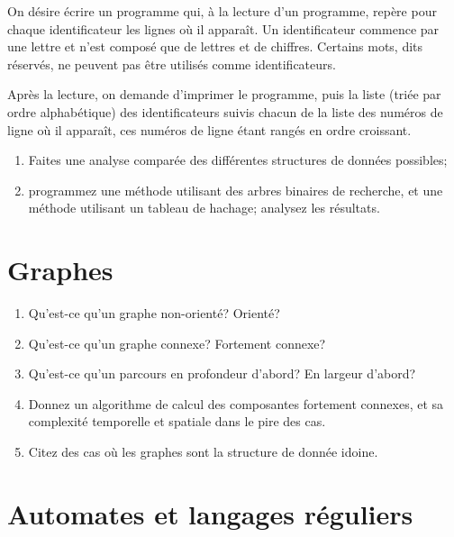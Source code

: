 \documentclass[11pt, a4paper]{article}
\begin{document}
On désire écrire un programme qui, à la lecture d'un programme, repère
pour chaque identificateur les lignes où il apparaît. Un
identificateur commence par une lettre et n'est composé que de lettres
et de chiffres. Certains mots, dits réservés, ne peuvent pas être
utilisés comme identificateurs.

Après la lecture, on demande d'imprimer le programme, puis la liste
(triée par ordre alphabétique) des identificateurs suivis chacun de la
liste des numéros de ligne où il apparaît, ces numéros de ligne étant
rangés en ordre croissant.

  \begin{enumerate}

    \item Faites une analyse comparée des différentes structures de
          données possibles;

    \item programmez une méthode utilisant des arbres binaires de
          recherche, et une méthode utilisant un tableau de hachage;
          analysez les résultats.

  \end{enumerate}


\section{Graphes}

  \begin{enumerate}

    \item Qu'est-ce qu'un graphe non-orienté? Orienté?

    \item Qu'est-ce qu'un graphe connexe? Fortement connexe?

    \item Qu'est-ce qu'un parcours en profondeur d'abord? En largeur
          d'abord?

    \item Donnez un algorithme de calcul des composantes fortement
          connexes, et sa complexité temporelle et spatiale dans le
          pire des cas.

    \item Citez des cas où les graphes sont la structure de donnée
          idoine.

  \end{enumerate}


\section{Automates et langages réguliers}
\end{document}
